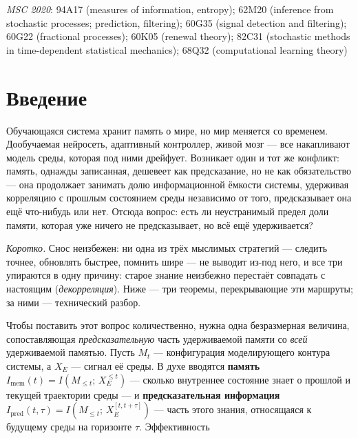 \documentclass[12pt]{iopart}
\begin{document}
\medskip\noindent\textit{MSC 2020}: 94A17 (measures of information, entropy); 62M20 (inference from stochastic processes; prediction, filtering); 60G35 (signal detection and filtering); 60G22 (fractional processes); 60K05 (renewal theory); 82C31 (stochastic methods in time-dependent statistical mechanics); 68Q32 (computational learning theory)

\maketitle

\section{Введение}\label{ux432ux432ux435ux434ux435ux43dux438ux435}



Обучающаяся система хранит память о мире, но мир меняется со временем. Дообучаемая нейросеть, адаптивный контроллер, живой мозг --- все накапливают модель среды, которая под ними дрейфует. Возникает один и тот же конфликт: память, однажды записанная, дешевеет как предсказание, но не как обязательство --- она продолжает занимать долю информационной ёмкости системы, удерживая корреляцию с прошлым состоянием среды независимо от того, предсказывает она ещё что-нибудь или нет. Отсюда вопрос: есть ли неустранимый предел доли памяти, которая уже ничего не предсказывает, но всё ещё удерживается?



\emph{Коротко.} Снос неизбежен: ни одна из трёх мыслимых стратегий --- следить точнее, обновлять быстрее, помнить шире --- не выводит из-под него, и все три упираются в одну причину: старое знание неизбежно перестаёт совпадать с настоящим (\emph{декорреляция}). Ниже --- три теоремы, перекрывающие эти маршруты; за ними --- технический разбор.



Чтобы поставить этот вопрос количественно, нужна одна безразмерная величина, сопоставляющая \emph{предсказательную} часть удерживаемой памяти со \emph{всей} удерживаемой памятью. Пусть \(M_t\) --- конфигурация моделирующего контура системы, а \(X_E\) --- сигнал её среды. В духе \cite{Still2012,BialekNemenmanTishby2001} вводятся \textbf{память} \(I_{\text{mem}}(t) = I(M_{\le t};\, X_E^{\le t})\) --- сколько внутреннее состояние знает о прошлой и текущей траектории среды --- и \textbf{предсказательная информация} \(I_{\text{pred}}(t,\tau) = I(M_{\le t};\, X_E^{[t,t+\tau]})\) --- часть этого знания, относящаяся к будущему среды на горизонте \(\tau\). Эффективность
\end{document}
